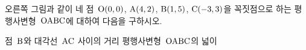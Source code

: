 \noindent\begin{minipage}[t]{0.58\linewidth}\vspace{0pt}\raggedright 오른쪽 그림과 같이 네 점~$\mathrm{O}(0{,}\mkern3mu\mathopen{}0)$, $\mathrm{A}(4{,}\mkern3mu\mathopen{}2)$, $\mathrm{B}(1{,}\mkern3mu\mathopen{}5)$, $\mathrm{C}(-3{,}\mkern3mu\mathopen{}3)$을 꼭짓점으로 하는 평행사변형~$\mathrm{OABC}$에 대하여 다음을 구하시오.\end{minipage}\hfill\begin{minipage}[t]{0.4\linewidth}\vspace{0pt}\centering \resizebox{\ifdim\width>\linewidth\linewidth\else\width\fi}{!}{}\end{minipage}\par
{} 점~$\mathrm{B}$와 대각선~$\mathrm{AC}$ 사이의 거리
 평행사변형~$\mathrm{OABC}$의 넓이

